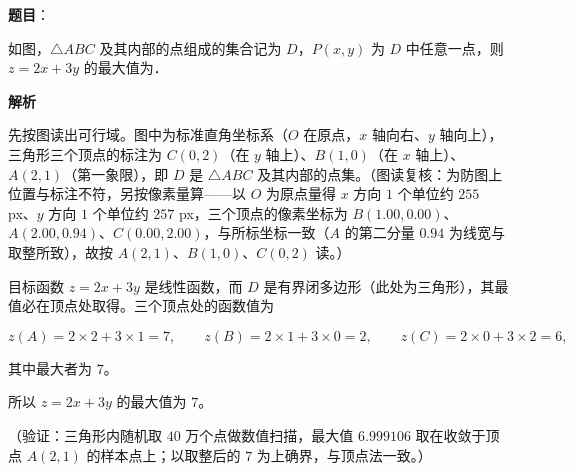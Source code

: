 \begin{answer}

\textbf{题目}：

如图，\(\triangle ABC\) 及其内部的点组成的集合记为 \(D\)，\(P(x,y)\) 为 \(D\) 中任意一点，则 \(z=2x+3y\) 的最大值为\gkblank{}．
\nopagebreak[4]
\begin{center}\end{center}
\nopagebreak[4]
\textbf{解析}

先按图读出可行域。图中为标准直角坐标系（\(O\) 在原点，\(x\) 轴向右、\(y\) 轴向上），三角形三个顶点的标注为 \(C(0,2)\)（在 \(y\) 轴上）、\(B(1,0)\)（在 \(x\) 轴上）、\(A(2,1)\)（第一象限），即 \(D\) 是 \(\triangle ABC\) 及其内部的点集。（图读复核：为防图上位置与标注不符，另按像素量算——以 \(O\) 为原点量得 \(x\) 方向 \(1\) 个单位约 \(255\) px、\(y\) 方向 \(1\) 个单位约 \(257\) px，三个顶点的像素坐标为 \(B(1.00,0.00)\)、\(A(2.00,0.94)\)、\(C(0.00,2.00)\)，与所标坐标一致（\(A\) 的第二分量 \(0.94\) 为线宽与取整所致），故按 \(A(2,1)\)、\(B(1,0)\)、\(C(0,2)\) 读。）

目标函数 \(z=2x+3y\) 是线性函数，而 \(D\) 是有界闭多边形（此处为三角形），其最值必在顶点处取得。三个顶点处的函数值为

\nopagebreak[4]
\[
z(A)=2\times2+3\times1=7,\qquad z(B)=2\times1+3\times0=2,\qquad z(C)=2\times0+3\times2=6,
\]

其中最大者为 \(7\)。

所以 \(z=2x+3y\) 的最大值为 \(7\)。

（验证：三角形内随机取 \(40\) 万个点做数值扫描，最大值 \(6.999106\) 取在收敛于顶点 \(A(2,1)\) 的样本点上；以取整后的 \(7\) 为上确界，与顶点法一致。）


\end{answer}
